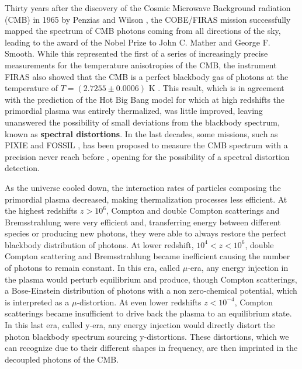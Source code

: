 Thirty years after the discovery of the Cosmic Microwave Background radiation (CMB) in 1965 by Penzias and Wilson \cite{1965ApJ...142..419P}, the COBE/FIRAS mission \cite{COBE1996} successfully mapped the spectrum of CMB photons coming from all directions of the sky, leading to the award of the Nobel Prize to John C. Mather and George F. Smooth. While this represented the first of a series of increasingly precise measurements for the temperature anisotropies of the CMB, the instrument FIRAS also showed that the CMB is a perfect blackbody gas of photons at the temperature of $T=(2.7255\pm0.0006)$ K \cite{COBE1996}. This result, which is in agreement with the prediction of the Hot Big Bang model for which at high redshifts the primordial plasma was entirely thermalized, was little improved, leaving unanswered the possibility of small deviations from the blackbody spectrum, known as \textbf{spectral distortions}. In the last decades, some missions, such as PIXIE \cite{pixie} and FOSSIL \cite{IAS_Fossil}, has been proposed to measure the CMB spectrum with a precision never reach before \cite{Chluba_2021}, opening for the possibility of a spectral distortion detection.

As the universe cooled down, the interaction rates of particles composing the primordial plasma decreased, making thermalization processes less efficient. At the highest redshifts $z>10^{6}$, Compton and double Compton scatterings and Bremsstrahlung were very efficient and, transferring energy between different species or producing new photons, they were able to always restore the perfect blackbody distribution of photons. At lower redshift, $10^{4}<z<10^{6}$, double Compton scattering and Bremsstrahlung became inefficient causing the number of photons to remain constant. In this era, called $\mu$-era, any energy injection in the plasma would perturb equilibrium and produce, though Compton scatterings, a Bose-Einstein distribution of photons with a non zero-chemical potential, which is interpreted as a $\mu$-distortion. At even lower redshifts $z<10^{-4}$, Compton scatterings became insufficient to drive back the plasma to an equilibrium state. In this last era, called y-era, any energy injection would directly distort the photon blackbody spectrum sourcing y-distortions. These distortions, which we can recognize due to their different shapes in frequency, are then imprinted in the decoupled photons of the CMB.

